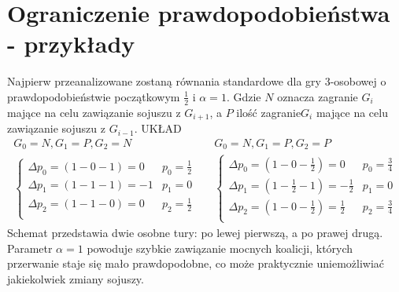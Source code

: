 \section{Ograniczenie prawdopodobieństwa - przykłady}
\label{sec:ograniczenie_przyk}
Najpierw przeanalizowane zostaną równania standardowe dla gry 3-osobowej o prawdopodobieństwie początkowym $\frac{1}{2}$ i $\alpha = 1$. Gdzie $N$ oznacza zagranie $G_i$ mające na celu zawiązanie sojuszu z $G_{i+1}$, a $P$ ilość zagranie$G_i$ mające na celu zawiązanie sojuszu z $G_{i-1}$.
{\color{red} UKŁAD}
\begin{align*}
G_0 = N, G_1 = P, G_2 = N && G_0 = N, G_1 = P, G_2 = P\\
\left\{
\begin{array}{cc}
\Delta p_0 = (1 - 0 - 1) =  0 & p_0=\frac{1}{2}\\
\Delta p_1 = (1 - 1 - 1) =  -1 & p_1= 0\\
\Delta p_2 = (1 - 1 - 0) =  0 & p_2=\frac{1}{2}\\
\end{array} 
\right. &&
\left\{
\begin{array}{cc}
\Delta p_0 = (1 - 0 - \frac{1}{2}) =  0 & p_0=\frac{3}{4}\\
\Delta p_1 = (1 - \frac{1}{2} - 1) =  -\frac{1}{2} & p_1= 0\\
\Delta p_2 = (1 - 0 - \frac{1}{2}) =  \frac{1}{2} & p_2=\frac{3}{4}\\
\end{array}
\right.
\end{align*}
Schemat przedstawia dwie osobne tury: po lewej pierwszą, a po prawej drugą. Parametr $\alpha=1$ powoduje szybkie zawiązanie mocnych koalicji, których przerwanie staje się mało prawdopodobne, co może praktycznie uniemożliwiać jakiekolwiek zmiany sojuszy.

